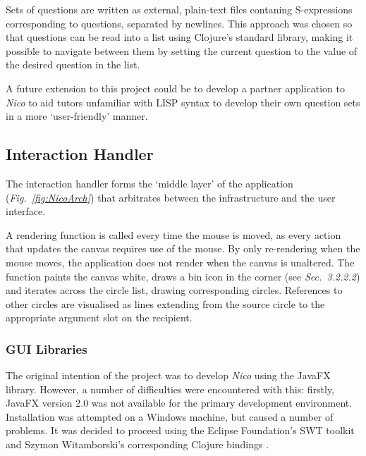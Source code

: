 \documentclass[12pt,twoside,notitlepage,xetex]{report}
\begin{document}
Sets of questions are written as external, plain-text files contaning S-expressions corresponding to questions, separated by newlines.  This approach was chosen so that questions can be read into a list using Clojure's standard library, making it possible to navigate between them by setting the current question to the value of the desired question in the list.

A future extension to this project could be to develop a partner application to \emph{Nico} to aid tutors unfamiliar with LISP syntax to develop their own question sets in a more `user-friendly' manner.

\subsection{Interaction Handler}
%

The interaction handler forms the `middle layer' of the application (\emph{Fig.~\ref{fig:NicoArch}}) that arbitrates between the infrastructure and the user interface.

A rendering function is called every time the mouse is moved, as every action that updates the canvas requires use of the mouse.  By only re-rendering when the mouse moves, the application does not render when the canvas is unaltered.  The function paints the canvas white, draws a bin icon in the corner (see \emph{Sec.~3.2.2.2}) and iterates across the circle list, drawing corresponding circles.  References to other circles are visualised as lines extending from the source circle to the appropriate argument slot on the recipient.

\subsubsection{GUI Libraries}

The original intention of the project was to develop \emph{Nico} using the JavaFX library. However, a number of difficulties were encountered with this: firstly, JavaFX version 2.0 was not available for the primary development environment.  Installation was attempted on a Windows machine, but caused a number of problems. It was decided to proceed using the Eclipse Foundation's SWT toolkit and Szymon Witamborski's corresponding Clojure bindings \cite{GuiFtw}.
\end{document}
